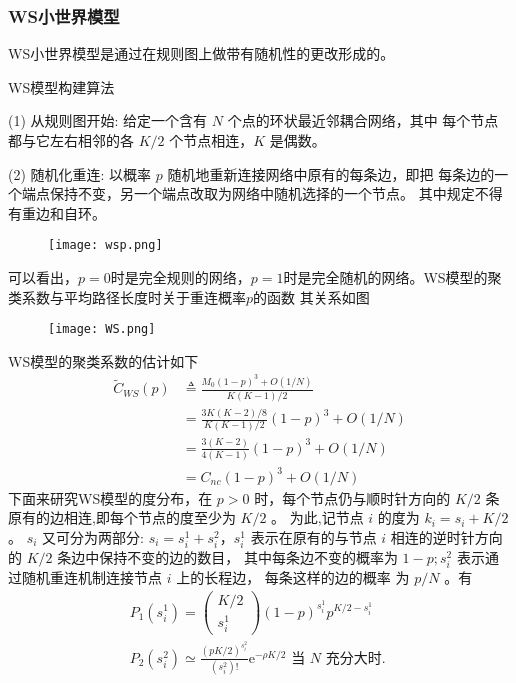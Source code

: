 \subsubsection*{WS小世界模型}
WS小世界模型是通过在规则图上做带有随机性的更改形成的。\par
\noindent WS模型构建算法\par
\noindent(1) 从规则图开始: 给定一个含有 $N$ 个点的环状最近邻耦合网络，其中 每个节点都与它左右相邻的各 $K / 2$ 个节点相连，$K$ 是偶数。\par
\noindent(2) 随机化重连: 以概率 $p$ 随机地重新连接网络中原有的每条边，即把 每条边的一个端点保持不变，另一个端点改取为网络中随机选择的一个节点。
其中规定不得有重边和自环。\par
\begin{figure}[!htbp]
    \centering
    \texttt{[image: wsp.png]}
\end{figure}
可以看出，$p=0$时是完全规则的网络，$p=1$时是完全随机的网络。WS模型的聚类系数与平均路径长度时关于重连概率$p$的函数
其关系如图
\begin{figure}[!htbp]
    \centering
    \texttt{[image: WS.png]}
\end{figure}
WS模型的聚类系数的估计如下
\begin{equation}
    \begin{aligned}
    \tilde{C}_{W S}(p) & \triangleq \frac{M_0(1-p)^3+O(1 / N)}{K(K-1) / 2} \\
    & =\frac{3 K(K-2) / 8}{K(K-1) / 2}(1-p)^3+O(1 / N) \\
    & =\frac{3(K-2)}{4(K-1)}(1-p)^3+O(1 / N) \\
    & =C_{n c}(1-p)^3+O(1 / N)
    \end{aligned}
\end{equation}
下面来研究WS模型的度分布，在 $p>0$ 时，每个节点仍与顺时针方向的 $K / 2$ 条原有的边相连,即每个节点的度至少为 $K / 2$ 。
 为此,记节点 $i$ 的度为 $k_i=s_i+K / 2$。 $s_i$ 又可分为两部分: 
 $s_i=s_i^1+s_i^2，s_i^1$ 表示在原有的与节点 $i$ 相连的逆时针方向的 $K / 2$ 条边中保持不变的边的数目，
 其中每条边不变的概率为 $1-p ; s_i^2$ 表示通过随机重连机制连接节点 $i$ 上的长程边，
 每条这样的边的概率 为 $p / N$ 。有
 \begin{equation}
    \begin{gathered}
    P_1\left(s_i^1\right)=\left(\begin{array}{c}
    K / 2 \\
    s_i^1
    \end{array}\right)(1-p)^{s_i^{1}} p^{K / 2-s_i^1}\\
    P_2\left(s_i^2\right) \simeq \frac{(p K / 2)^{s_i^2}}{\left(s_i^2\right) !} \mathrm{e}^{-\rho K / 2}\text { 当 } N \text { 充分大时. }
    \end{gathered}
\end{equation}
